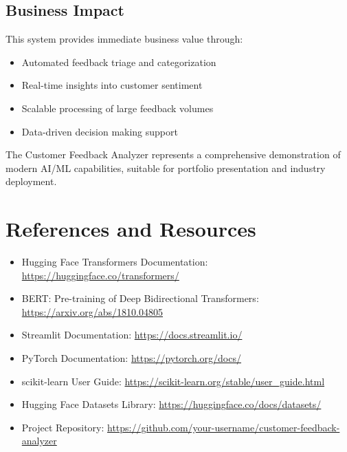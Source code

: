 \documentclass[11pt,a4paper]{article}
\begin{document}
\subsection{Business Impact}
This system provides immediate business value through:
\begin{itemize}
  \item Automated feedback triage and categorization
  \item Real-time insights into customer sentiment
  \item Scalable processing of large feedback volumes
  \item Data-driven decision making support
\end{itemize}

The Customer Feedback Analyzer represents a comprehensive demonstration of modern AI/ML capabilities, suitable for portfolio presentation and industry deployment.

\section{References and Resources}

\begin{itemize}
  \item Hugging Face Transformers Documentation: \url{https://huggingface.co/transformers/}
  \item BERT: Pre-training of Deep Bidirectional Transformers: \url{https://arxiv.org/abs/1810.04805}
  \item Streamlit Documentation: \url{https://docs.streamlit.io/}
  \item PyTorch Documentation: \url{https://pytorch.org/docs/}
  \item scikit-learn User Guide: \url{https://scikit-learn.org/stable/user_guide.html}
  \item Hugging Face Datasets Library: \url{https://huggingface.co/docs/datasets/}
  \item Project Repository: \url{https://github.com/your-username/customer-feedback-analyzer}
\end{itemize}
\end{document}
